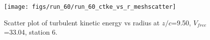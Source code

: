 \begin{figure}[H]
\centering
\texttt{[image: figs/run\_60/run\_60\_ctke\_vs\_r\_meshscatter]}
\caption{Scatter plot of turbulent kinetic energy vs radius at $z/c$=9.50, $V_{free}$=33.04, station 6.}
\end{figure}


